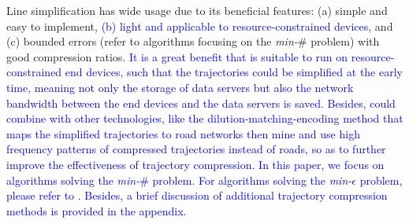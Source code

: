 %
Line simplification has wide usage due to its beneficial features: (a) simple and easy to implement, \textcolor{blue}{(b) light and applicable to resource-constrained devices}, and (c) bounded errors (refer to algorithms focusing on the \emph{min-$\#$} problem) with good compression ratios.
%
\textcolor{blue}{It is a great benefit that \lsa is suitable to run on resource-constrained end devices, such that the trajectories could be simplified at the early time, meaning not only the storage of data servers but also the network bandwidth between the end devices and the data servers is saved. Besides, \lsa could combine with other technologies, like the dilution-matching-encoding \cite{Gotsman:Compaction} method that maps the simplified trajectories to road networks then mine and use high frequency patterns of compressed trajectories instead of roads, so as to further improve the effectiveness of trajectory compression.}
%
\textcolor{blue}{In this paper, we focus on \lsa algorithms solving the \emph{min-$\#$} problem. For algorithms solving the \emph{min-$\epsilon$} problem, please refer to \cite{Muckell:SQUISH,Muckell:Compression,Zhang:Evaluation}. Besides, a brief discussion of additional trajectory compression methods is provided in the appendix.}
%
%



